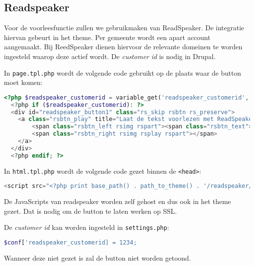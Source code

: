 \subsection{Readspeaker}\label{readspeaker}

Voor de voorleesfunctie zullen we gebruikmaken van ReadSpeaker. De integratie hiervan gebeurt in het theme. Per gemeente wordt een apart account aangemaakt. Bij ReedSpeaker dienen hiervoor de relevante domeinen te worden ingesteld waarop deze actief wordt. De \emph{customer id} is nodig in Drupal.

In \texttt{page.tpl.php} wordt de volgende code gebruikt op de plaats waar de button moet komen:

\begin{lstlisting}[language=PHP]
  <?php $readspeaker_customerid = variable_get('readspeaker_customerid', 0); ?>
  <?php if ($readspeaker_customerid): ?>
  <div id="readspeaker_button1" class="rs_skip rsbtn rs_preserve">
    <a class="rsbtn_play" title="Laat de tekst voorlezen met ReadSpeaker" href="//app.eu.readspeaker.com/cgi-bin/rsent?customerid=<?php print $readspeaker_customerid; ?>&amp;lang=nl_nl&amp;readid=main&amp;url=<?php echo urlencode($_SERVER['HTTP_HOST'] . $_SERVER['REQUEST_URI']); ?>">
        <span class="rsbtn_left rsimg rspart"><span class="rsbtn_text"><span>Lees voor</span></span></span>
        <span class="rsbtn_right rsimg rsplay rspart"></span>
    </a>
  </div>
  <?php endif; ?>
\end{lstlisting}

In \texttt{html.tpl.php} wordt de volgende code gezet binnen de \texttt{\textless head\textgreater}:
\begin{lstlisting}[language=PHP]
<script src="<?php print base_path() . path_to_theme() . '/readspeaker/ReadSpeaker.js?pids=embhl'; ?>"></script>
\end{lstlisting}

De JavaScripts van readspeaker worden zelf gehost en dus ook in het theme gezet. Dat is nodig om de button te laten werken op SSL.

De \emph{customer id} kan worden ingesteld in \texttt{settings.php}:
\begin{lstlisting}[language=PHP]
$conf['readspeaker_customerid] = 1234;
\end{lstlisting}

Wanneer deze niet gezet is zal de button niet worden getoond.